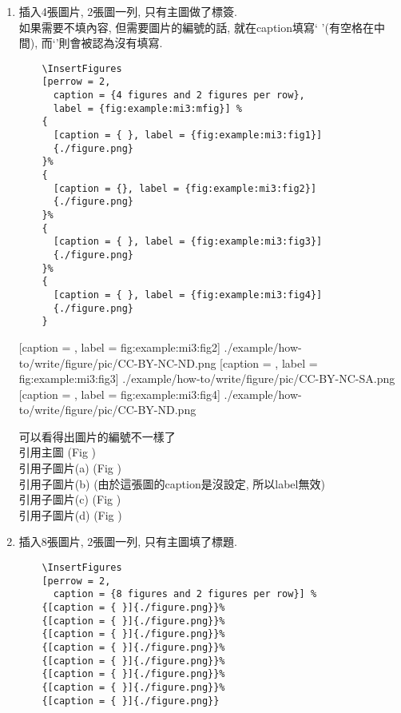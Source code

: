 \begin{enumerate}
{    e.g:
    引用主圖 (Fig ) ,
    引用子圖片 (Fig , Fig ).
  } %

  \newpage
  \item
  {
    插入4張圖片, 2張圖一列, 只有主圖做了標簽.\\
    如果需要不填內容, 但需要圖片的編號的話, 就在caption填寫`{ }'(有空格在中間), 而`{}'則會被認為沒有填寫.
    \begin{verbatim}
    \InsertFigures
    [perrow = 2,
      caption = {4 figures and 2 figures per row},
      label = {fig:example:mi3:mfig}] %
    {
      [caption = { }, label = {fig:example:mi3:fig1}]
      {./figure.png}
    }%
    {
      [caption = {}, label = {fig:example:mi3:fig2}]
      {./figure.png}
    }%
    {
      [caption = { }, label = {fig:example:mi3:fig3}]
      {./figure.png}
    }%
    {
      [caption = { }, label = {fig:example:mi3:fig4}]
      {./figure.png}
    }
    \end{verbatim}

    {
      [caption = {},
      label = {fig:example:mi3:fig2}]
      {./example/how-to/write/figure/pic/CC-BY-NC-ND.png}
    }%
    {
      [caption = { },
      label = {fig:example:mi3:fig3}]
      {./example/how-to/write/figure/pic/CC-BY-NC-SA.png}
    }%
    {
      [caption = { },
      label = {fig:example:mi3:fig4}]
      {./example/how-to/write/figure/pic/CC-BY-ND.png}
    }

    可以看得出圖片的編號不一樣了\\
    引用主圖 (Fig )\\
    引用子圖片(a) (Fig )\\
    引用子圖片(b) (由於這張圖的caption是沒設定, 所以label無效)\\
    引用子圖片(c) (Fig )\\
    引用子圖片(d) (Fig )
  } %

  \newpage
  \item
  {
    插入8張圖片, 2張圖一列, 只有主圖填了標題.\\
    \begin{verbatim}
    \InsertFigures
    [perrow = 2,
      caption = {8 figures and 2 figures per row}] %
    {[caption = { }]{./figure.png}}%
    {[caption = { }]{./figure.png}}%
    {[caption = { }]{./figure.png}}%
    {[caption = { }]{./figure.png}}%
    {[caption = { }]{./figure.png}}%
    {[caption = { }]{./figure.png}}%
    {[caption = { }]{./figure.png}}%
    {[caption = { }]{./figure.png}}
    \end{verbatim}

}
\end{enumerate}
